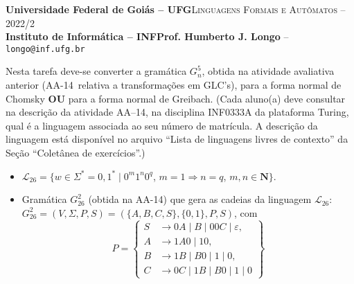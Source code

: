 \documentclass[12pt]{article}
\def\discente{Iury Alexandre Alves Bo}
\def\matricula{202103735}
\def\ua{15}
\def\up{14}
\def\myling{{26}} %
\newcommand{\ve}{\ensuremath{\varepsilon}}
\begin{document}
 \begin{tcolorbox}[rounded corners, colback=blue!3, colframe=blue!40!black]
  \footnotesize\textbf{Universidade Federal de Goiás -- UFG}\hfill \textsc{Linguagens Formais e Autômatos -- 2022/2}\\
  \footnotesize\textbf{Instituto de Informática -- INF\hfill Prof. Humberto J. Longo} -- \scriptsize\texttt{longo@inf.ufg.br}
 \end{tcolorbox}\bigskip
%
\begin{tcolorbox}[rounded corners, colback=blue!2, colframe=blue!40!black, title=\textbf{Atividade AA-\ua}]
 Nesta tarefa deve-se converter a gramática $G_n^5$, obtida na atividade avaliativa anterior (AA-\up\ relativa a transformações em GLC's), para a forma normal de Chomsky \textbf{OU} para a forma normal de Greibach. (Cada aluno(a) deve consultar na descrição da atividade AA--\up, na disciplina INF0333A da plataforma Turing, qual é a linguagem associada ao seu número de matrícula. A descrição da linguagem está disponível no arquivo ``Lista de linguagens livres de contexto'' da Seção ``Coletânea de exercícios''.)
\end{tcolorbox}\bigskip

%
\begin{tcolorbox}[rounded corners, colback=yellow!5, colframe=red!40!black, title={\discente\ (\matricula)}]
\begin{itemize}
  \item  $\mathcal{L}_{\myling} = \{w \in \Sigma^* = {0,1}^* \mid 0^m1^n0^q$, $m = 1 \Longrightarrow n = q$, $m,n \in \mathbf{N}\}$.
  \item Gramática $G_{\myling}^2$ (obtida na AA-\up) que gera as cadeias da linguagem $\mathcal{L}_{\myling}$:\\
  $G_{\myling}^2=(V,\Sigma,P,S)=(\{A,B,C,S\},\{0,1\},P,S)$, com
    \[P=\left\{
     \begin{aligned}
      S & \to 0A \mid B \mid 00C \mid \ve, \\
      A & \to 1A0 \mid 10, \\
      B & \to 1B \mid B0 \mid 1 \mid 0, \\
      C & \to 0C \mid 1B \mid B0 \mid 1 \mid 0
     \end{aligned}
    \right\}\]
 \end{itemize}
\end{tcolorbox}\bigskip
\end{document}
